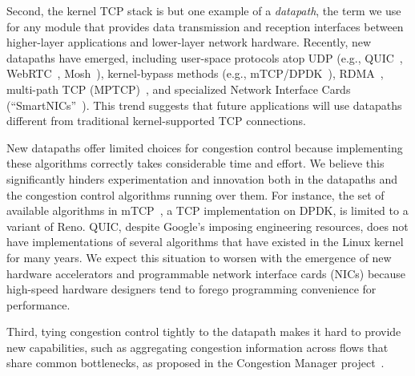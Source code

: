Second, the kernel TCP stack is but one example of a {\em datapath}, the term we use for any module that provides data transmission and reception interfaces between higher-layer applications and lower-layer network hardware. Recently, new datapaths have emerged, including user-space protocols atop UDP (e.g., QUIC~\cite{quic}, WebRTC~\cite{webrtc}, Mosh~\cite{mosh}), kernel-bypass methods (e.g., mTCP/DPDK~\cite{dpdk,mtcp,netmap}), RDMA~\cite{dcqcn}, multi-path TCP (MPTCP)~\cite{mptcp}, and specialized Network Interface Cards (``SmartNICs''~\cite{smartnic}). This trend suggests that future applications will use datapaths different from traditional kernel-supported TCP connections.
%

New datapaths offer limited choices for congestion control because implementing these algorithms correctly takes considerable time and effort. 
We believe this significantly hinders experimentation and innovation both in the datapaths and the congestion control algorithms running over them.
For instance, the set of available algorithms in mTCP~\cite{mtcp}, a TCP implementation on DPDK, is limited to a variant of Reno. 
QUIC, despite Google's imposing engineering resources, does not have implementations of several algorithms that have existed in the Linux kernel for many years.  
We expect this situation to worsen with the emergence of new hardware accelerators and programmable network interface cards (NICs) because high-speed hardware designers tend to forego programming convenience for performance. 

Third, tying congestion control tightly to the datapath makes it hard to provide new capabilities, such as aggregating congestion information across flows that share common bottlenecks, as proposed in the Congestion Manager project~\cite{cm}. 

